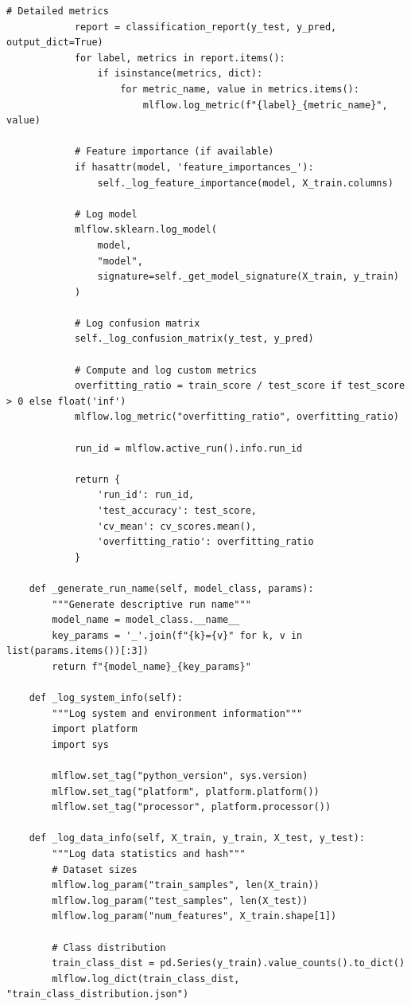 \begin{lstlisting}[style=python, caption=Comprehensive MLflow experiment tracking]
            # Detailed metrics
            report = classification_report(y_test, y_pred, output_dict=True)
            for label, metrics in report.items():
                if isinstance(metrics, dict):
                    for metric_name, value in metrics.items():
                        mlflow.log_metric(f"{label}_{metric_name}", value)

            # Feature importance (if available)
            if hasattr(model, 'feature_importances_'):
                self._log_feature_importance(model, X_train.columns)

            # Log model
            mlflow.sklearn.log_model(
                model,
                "model",
                signature=self._get_model_signature(X_train, y_train)
            )

            # Log confusion matrix
            self._log_confusion_matrix(y_test, y_pred)

            # Compute and log custom metrics
            overfitting_ratio = train_score / test_score if test_score > 0 else float('inf')
            mlflow.log_metric("overfitting_ratio", overfitting_ratio)

            run_id = mlflow.active_run().info.run_id

            return {
                'run_id': run_id,
                'test_accuracy': test_score,
                'cv_mean': cv_scores.mean(),
                'overfitting_ratio': overfitting_ratio
            }

    def _generate_run_name(self, model_class, params):
        """Generate descriptive run name"""
        model_name = model_class.__name__
        key_params = '_'.join(f"{k}={v}" for k, v in list(params.items())[:3])
        return f"{model_name}_{key_params}"

    def _log_system_info(self):
        """Log system and environment information"""
        import platform
        import sys

        mlflow.set_tag("python_version", sys.version)
        mlflow.set_tag("platform", platform.platform())
        mlflow.set_tag("processor", platform.processor())

    def _log_data_info(self, X_train, y_train, X_test, y_test):
        """Log data statistics and hash"""
        # Dataset sizes
        mlflow.log_param("train_samples", len(X_train))
        mlflow.log_param("test_samples", len(X_test))
        mlflow.log_param("num_features", X_train.shape[1])

        # Class distribution
        train_class_dist = pd.Series(y_train).value_counts().to_dict()
        mlflow.log_dict(train_class_dist, "train_class_distribution.json")


\end{lstlisting}
